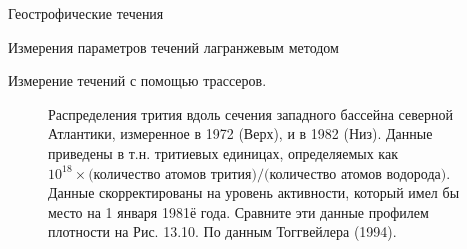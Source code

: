 \begin{chapter}{Геострофические течения}
\begin{section}{Измерения параметров течений лагранжевым методом}
\begin{paragraph}{Измерение течений с помощью трассеров.}
\begin{figure}[t!]
\caption{Распределения трития вдоль сечения западного бассейна
северной Атлантики, измеренное в 1972 (Верх), и в 1982 (Низ). Данные
приведены в т.н. тритиевых единицах, определяемых как 
$10^{18}\times \text{(количество атомов трития)}/
\text{(количество атомов водорода)}$. Данные
скорректированы на уровень активности, который имел бы место на 1
января 1981ё года. Сравните эти данные профилем плотности на
Рис. 13.10. По данным Тоггвейлера (1994).}
\label{fig:tritium}
\end{figure}
%


\end{paragraph}
\end{section}
\end{chapter}

